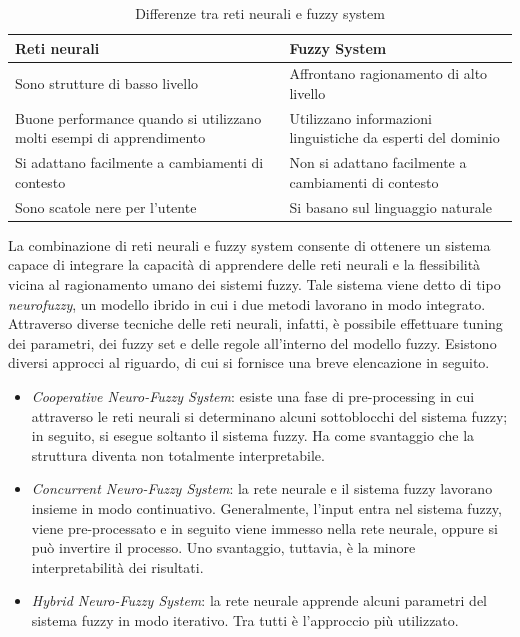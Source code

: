 \documentclass[11pt,  oneside, openany]{book}
\begin{document}
\begin{table}[h!]
\centering
\begin{tabular}{ |p{7cm}|p{7cm}| } 
\hline
\textbf{Reti neurali} & \textbf{Fuzzy System} \\
\hline
\hline
Sono strutture di basso livello & Affrontano ragionamento di alto livello\\ 
\hline
Buone performance quando si utilizzano molti esempi di apprendimento & Utilizzano informazioni linguistiche da esperti del dominio \\
\hline
Si adattano facilmente a cambiamenti di contesto & Non si adattano facilmente a cambiamenti di contesto \\
\hline
Sono scatole nere per l'utente & Si basano sul linguaggio naturale\\
\hline

\end{tabular}
\caption{Differenze tra reti neurali e fuzzy system}
\label{table:0}
\end{table}

La combinazione di reti neurali e fuzzy system consente di ottenere un sistema capace di integrare la capacità di apprendere delle reti neurali e la flessibilità vicina al ragionamento umano dei sistemi fuzzy. Tale sistema viene detto di tipo \textit{neurofuzzy}, un modello ibrido in cui i due metodi lavorano in modo integrato. Attraverso diverse tecniche delle reti neurali, infatti, è possibile effettuare tuning dei parametri, dei fuzzy set e delle regole all'interno del modello fuzzy. 
Esistono diversi approcci al riguardo, di cui si fornisce una breve elencazione in seguito. 

\begin{itemize}
\item \textit{Cooperative Neuro-Fuzzy System}: esiste una fase di pre-processing in cui attraverso le reti neurali si determinano alcuni sottoblocchi del sistema fuzzy; in seguito, si esegue soltanto il sistema fuzzy. Ha come svantaggio che la struttura diventa non totalmente interpretabile. 
\item \textit{Concurrent Neuro-Fuzzy System}: la rete neurale e il sistema fuzzy lavorano insieme in modo continuativo. Generalmente, l'input entra nel sistema fuzzy, viene pre-processato e in seguito viene immesso nella rete neurale, oppure si può invertire il processo. Uno svantaggio, tuttavia, è la minore interpretabilità dei risultati. 
\item \textit{Hybrid Neuro-Fuzzy System}: la rete neurale apprende alcuni parametri del sistema fuzzy in modo iterativo. Tra tutti è l'approccio più utilizzato. 
\end{itemize}
\end{document}
